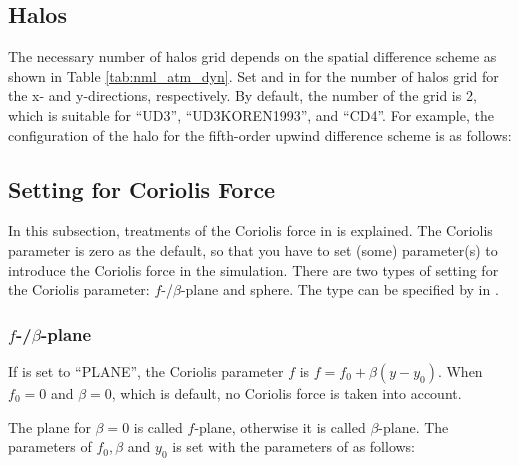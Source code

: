 \subsection{Halos}

The necessary number of halos grid depends on the spatial difference scheme as shown in Table \ref{tab:nml_atm_dyn}.
Set  and  in  for the number of halos grid for the x- and y-directions, respectively.
By default, the number of the grid is 2, which is suitable for ``UD3'', ``UD3KOREN1993'', and ``CD4''.
For example, the configuration of the halo for the fifth-order upwind difference scheme is as follows:



\subsection{Setting for Coriolis Force} \label{subsec:coriolis}

In this subsection, treatments of the Coriolis force in \scalerm is explained.
The Coriolis parameter is zero as the default, so that you have to set (some) parameter(s) to introduce the Coriolis force in the simulation.
There are two types of setting for the Coriolis parameter: $f$-/$\beta$-plane and sphere.
The type can be specified by  in .

\subsubsection{$f$-/$\beta$-plane}
If  is set to ``PLANE'', the Coriolis parameter $f$ is $f=f_0 + \beta (y-y_0)$.
When $f_0=0$ and $\beta=0$, which is default, no Coriolis force is taken into account.

The plane for $\beta=0$ is called $f$-plane, otherwise it is called $\beta$-plane.
The parameters of $f_0, \beta$ and $y_0$ is set with the parameters of  as follows:

